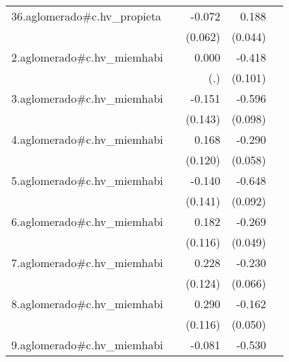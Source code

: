{\begin{longtable}{l*{4}{D{.}{.}{-1}}}
\addlinespace
36.aglomerado#c.hv\_propieta&                     &      -0.072         &       0.188\sym{***}&                     \\
            &                     &     (0.062)         &     (0.044)         &                     \\
\addlinespace
2.aglomerado#c.hv\_miemhabi&                     &       0.000         &      -0.418\sym{***}&                     \\
            &                     &         (.)         &     (0.101)         &                     \\
\addlinespace
3.aglomerado#c.hv\_miemhabi&                     &      -0.151         &      -0.596\sym{***}&                     \\
            &                     &     (0.143)         &     (0.098)         &                     \\
\addlinespace
4.aglomerado#c.hv\_miemhabi&                     &       0.168         &      -0.290\sym{***}&                     \\
            &                     &     (0.120)         &     (0.058)         &                     \\
\addlinespace
5.aglomerado#c.hv\_miemhabi&                     &      -0.140         &      -0.648\sym{***}&                     \\
            &                     &     (0.141)         &     (0.092)         &                     \\
\addlinespace
6.aglomerado#c.hv\_miemhabi&                     &       0.182         &      -0.269\sym{***}&                     \\
            &                     &     (0.116)         &     (0.049)         &                     \\
\addlinespace
7.aglomerado#c.hv\_miemhabi&                     &       0.228         &      -0.230\sym{***}&                     \\
            &                     &     (0.124)         &     (0.066)         &                     \\
\addlinespace
8.aglomerado#c.hv\_miemhabi&                     &       0.290\sym{*}  &      -0.162\sym{**} &                     \\
            &                     &     (0.116)         &     (0.050)         &                     \\
\addlinespace
9.aglomerado#c.hv\_miemhabi&                     &      -0.081         &      -0.530\sym{***}&                     \\

\end{longtable}}
